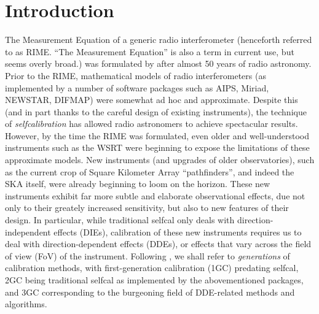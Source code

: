\documentclass[]{aa}
\begin{document}

\maketitle

\section*{Introduction}

The Measurement Equation of a generic radio interferometer (henceforth referred to as RIME. ``The Measurement Equation'' is also a term in current use, but seems overly broad.) was formulated by \citet{ME1} after almost 50 years of radio astronomy. Prior to the RIME, mathematical models of radio interferometers (as implemented by a number of software packages such as AIPS, Miriad, NEWSTAR, DIFMAP) were somewhat ad hoc and approximate. Despite this (and in part thanks to the careful design of existing instruments), the technique of {\em selfcalibration} \citep{Cornwell:selfcal} has allowed radio astronomers to achieve spectacular results. However, by the time the RIME was formulated, even older and well-understood instruments such as the WSRT were beginning to expose the limitations of these approximate models. New instruments (and upgrades of older observatories), such as the current crop of Square Kilometer Array \citep{Schilizzi:SKA} ``pathfinders'', and indeed the SKA itself, were already beginning to loom on the horizon. These new instruments exhibit far more subtle and elaborate observational effects, due not only to their greately increased sensitivity, but also to new features of their design. In particular, while traditional selfcal only deals with direction-independent effects (DIEs), calibration of these new instruments requires us to deal with direction-dependent effects (DDEs), or effects that vary across the field of view (FoV) of the instrument. Following \citet{meqtrees}, we shall refer to \emph{generations} of calibration methods, with first-generation calibration (1GC) predating selfcal, 2GC being traditional selfcal as implemented by the abovementioned packages, and 3GC corresponding to the burgeoning field of DDE-related methods and algorithms. 
\end{document}
